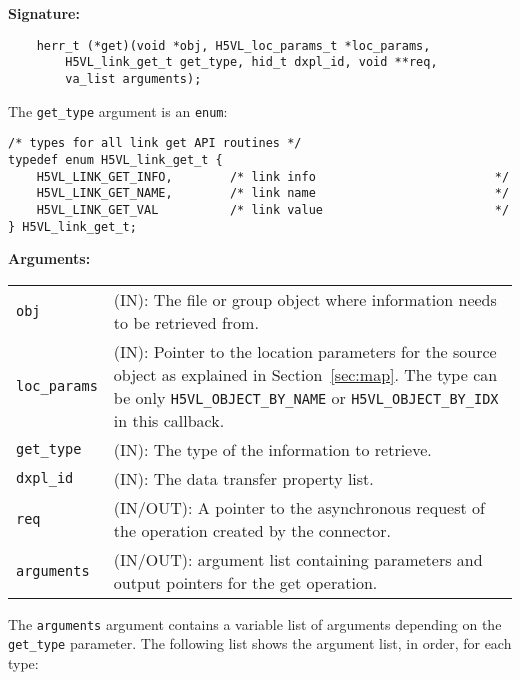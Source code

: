 \begin{mdframed}[style=bgbox]
\textbf{Signature:}
\begin{lstlisting}
    herr_t (*get)(void *obj, H5VL_loc_params_t *loc_params, 
        H5VL_link_get_t get_type, hid_t dxpl_id, void **req, 
        va_list arguments);
\end{lstlisting}

The \texttt{get\_type} argument is an \texttt{enum}:
\begin{lstlisting}
/* types for all link get API routines */
typedef enum H5VL_link_get_t {                                                   
    H5VL_LINK_GET_INFO,        /* link info                         */           
    H5VL_LINK_GET_NAME,        /* link name                         */           
    H5VL_LINK_GET_VAL          /* link value                        */           
} H5VL_link_get_t; 
\end{lstlisting}

\textbf{Arguments:}\\
\begin{tabular}{l p{13.5cm}}
  \texttt{obj} & (IN): The file or group object where information needs to be
  retrieved from.\\
  \texttt{loc\_params} & (IN): Pointer to the location parameters for the source
  object as explained in Section~\ref{sec:map}. The type can be only \texttt{H5VL\_OBJECT\_BY\_NAME} or \texttt{H5VL\_OBJECT\_BY\_IDX} in this
  callback.\\ 
  \texttt{get\_type} & (IN): The type of the information to retrieve.\\
  \texttt{dxpl\_id} & (IN): The data transfer property list.\\
  \texttt{req} & (IN/OUT): A pointer to the asynchronous request of the
  operation created by the connector.\\
  \texttt{arguments} & (IN/OUT): argument list containing parameters and
  output pointers for the get operation. \\
\end{tabular}
\end{mdframed}

The \texttt{arguments} argument contains a variable list of arguments
depending on the \texttt{get\_type} parameter. The following list shows
the argument list, in order, for each type:

